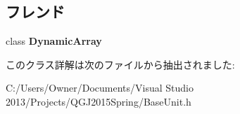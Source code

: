 \subsection*{フレンド}
\begin{DoxyCompactItemize}
\item 
class {\bfseries Dynamic\+Array}\hypertarget{class_dynamic_array_1_1iterator_a845f49ed7330a208136c47af630fe8d3}{}\label{class_dynamic_array_1_1iterator_a845f49ed7330a208136c47af630fe8d3}

\end{DoxyCompactItemize}


このクラス詳解は次のファイルから抽出されました\+:\begin{DoxyCompactItemize}
\item 
C\+:/\+Users/\+Owner/\+Documents/\+Visual Studio 2013/\+Projects/\+Q\+G\+J2015\+Spring/Base\+Unit.\+h\end{DoxyCompactItemize}
